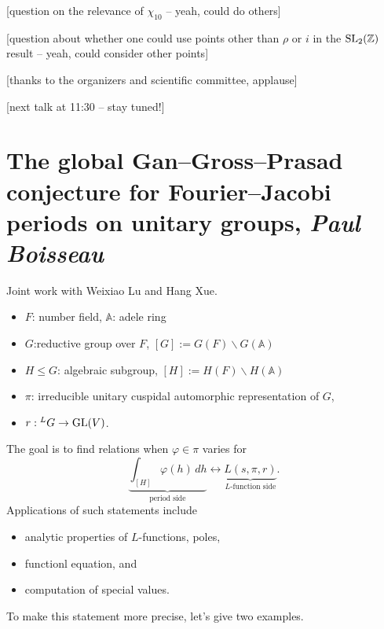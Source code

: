 \documentclass[reqno]{amsart} 
\begin{document}
[question on the relevance of $\chi_{10}$ -- yeah, could do others]

[question about whether one could use points other than $\rho$ or $i$ in the $\operatorname{SL}_2(\mathbb{Z})$ result -- yeah, could consider other points]

[thanks to the organizers and scientific committee, applause]

[next talk at 11:30 -- stay tuned!]

\section{The global Gan--Gross--Prasad conjecture for Fourier--Jacobi periods on unitary groups, \textnormal{\emph{Paul Boisseau}}}

Joint work with Weixiao Lu and Hang Xue.

\begin{itemize}
\item $F$: number field, $\mathbb{A}$: adele ring
\item $G$:reductive group over $F$, $[G] := G(F) \backslash G(\mathbb{A})$
\item $H \leq G$: algebraic subgroup, $[H] := H(F) \backslash H(\mathbb{A})$
\item $\pi$: irreducible unitary cuspidal automorphic representation of $G$,
\item $r : {}^L G \rightarrow \operatorname{GL}(V)$.
\end{itemize}
The goal is to find relations when $\varphi \in \pi$ varies for
\begin{equation*}
\underbrace
{
  \int_{[H]} \varphi(h) \, d h
}_{
  \text{period side}
}
\longleftrightarrow
\underbrace
{
  L(s, \pi, r)
}_{
  \text{$L$-function side}
}.
\end{equation*}
Applications of such statements include
\begin{itemize}
\item analytic properties of $L$-functions, poles,
\item functionl equation, and
\item computation of special values.
\end{itemize}
To make this statement more precise, let's give two examples.
\end{document}
